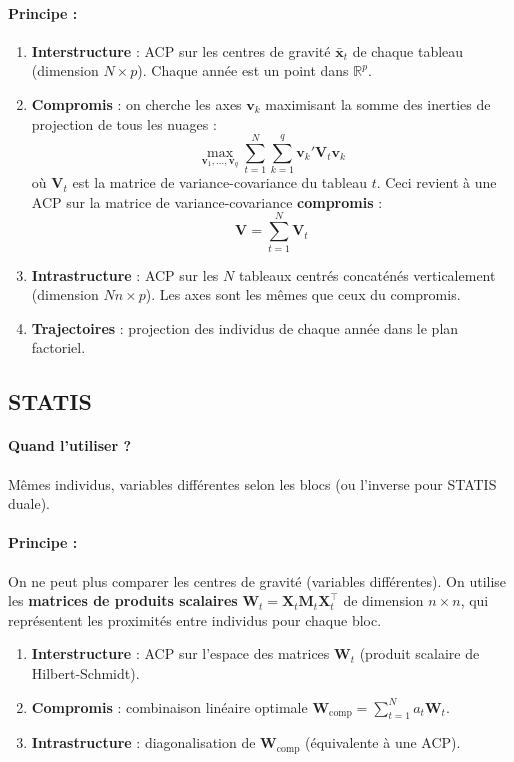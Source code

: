 \documentclass[a4paper,11pt]{article}
\begin{document}
\paragraph{Principe :}
\begin{enumerate}
    \item \textbf{Interstructure} : ACP sur les centres de gravité $\bar{\mathbf{x}}_t$ de chaque tableau (dimension $N \times p$). Chaque année est un point dans $\mathbb{R}^p$.
    \item \textbf{Compromis} : on cherche les axes $\mathbf{v}_k$ maximisant la somme des inerties de projection de tous les nuages :
    \[
    \max_{\mathbf{v}_1,\ldots,\mathbf{v}_q} \sum_{t=1}^N \sum_{k=1}^q \mathbf{v}_k' \mathbf{V}_t \mathbf{v}_k
    \]
    où $\mathbf{V}_t$ est la matrice de variance-covariance du tableau $t$. Ceci revient à une ACP sur la matrice de variance-covariance \textbf{compromis} :
    \[
    \mathbf{V} = \sum_{t=1}^N \mathbf{V}_t
    \]
    \item \textbf{Intrastructure} : ACP sur les $N$ tableaux centrés concaténés verticalement (dimension $Nn \times p$). Les axes sont les mêmes que ceux du compromis.
    \item \textbf{Trajectoires} : projection des individus de chaque année dans le plan factoriel.
\end{enumerate}

\subsection{STATIS}
\paragraph{Quand l'utiliser ?}
Mêmes individus, variables différentes selon les blocs (ou l'inverse pour STATIS duale).

\paragraph{Principe :}
On ne peut plus comparer les centres de gravité (variables différentes). On utilise les \textbf{ matrices de produits scalaires} $\mathbf{W}_t = \mathbf{X}_t \mathbf{M}_t \mathbf{X}_t^\top$ de dimension $n \times n$, qui représentent les proximités entre individus pour chaque bloc.
\begin{enumerate}
    \item \textbf{Interstructure} : ACP sur l'espace des matrices $\mathbf{W}_t$ (produit scalaire de Hilbert-Schmidt).
    \item \textbf{Compromis} : combinaison linéaire optimale $\mathbf{W}_{\text{comp}} = \sum_{t=1}^N a_t \mathbf{W}_t$.
    \item \textbf{Intrastructure} : diagonalisation de $\mathbf{W}_{\text{comp}}$ (équivalente à une ACP).
\end{enumerate}
\end{document}
